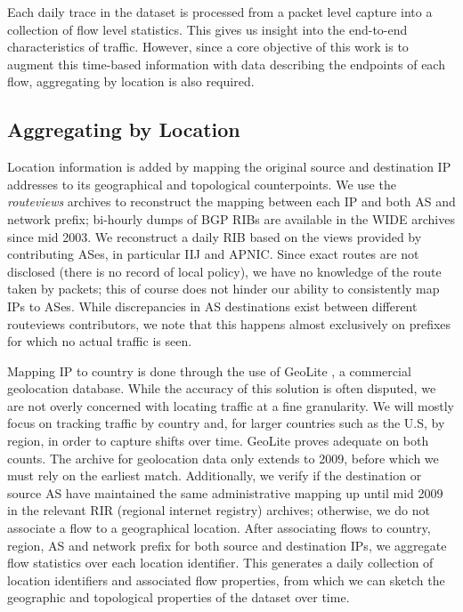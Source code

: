 Each daily trace in the dataset is processed from a packet level capture into a collection of flow level statistics. 
This gives us insight into the end-to-end characteristics of traffic. However, since a core objective of this work is to augment this time-based information with data describing the endpoints of each flow, aggregating by location is also required. 

\subsection{Aggregating by Location}

Location information is added by mapping the original source and destination IP addresses to its geographical and topological counterpoints. 
We use the \emph{routeviews} archives to reconstruct the mapping between each IP and both AS and network prefix; bi-hourly dumps of BGP RIBs are available in the WIDE archives since mid 2003. 
We reconstruct a daily RIB based on the views provided by contributing ASes, in particular IIJ and APNIC. 
Since exact routes are not disclosed (there is no record of local policy), we have no knowledge of the route taken by packets; this of course does not hinder our ability to consistently map IPs to ASes. While discrepancies in AS destinations exist between different routeviews contributors, we note that this happens almost exclusively on prefixes for which no actual traffic is seen. 

Mapping IP to country is done through the use of GeoLite \cite{maxmind}, a commercial geolocation database. 
While the accuracy of this solution is often disputed, we are not overly concerned with locating traffic at a fine granularity. 
We will mostly focus on tracking traffic by country and, for larger countries such as the U.S, by region, in order to capture shifts over time.
GeoLite proves adequate on both counts.
The archive for geolocation data only extends to 2009, before which we must rely on the earliest match. 
Additionally, we verify if the destination or source AS have maintained the same administrative mapping up until mid 2009 in the relevant RIR (regional internet registry) archives; otherwise, we do not associate a flow to a geographical location.
After associating flows to country, region, AS and network prefix for both source and destination IPs, we aggregate flow statistics over each location identifier. 
This generates a daily collection of location identifiers and associated flow properties, from which we can sketch the geographic and topological properties of the dataset over time.

